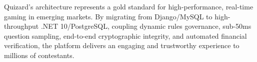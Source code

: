 \documentclass[11pt,a4paper,oneside]{report}
\begin{document}
\begin{tcolorbox}[summarybox, title={Final Architecture Conclusion}]
Quizard's architecture represents a gold standard for high-performance, real-time gaming in emerging markets. By migrating from Django/MySQL to high-throughput .NET 10/PostgreSQL, coupling dynamic rules governance, sub-50ms question sampling, end-to-end cryptographic integrity, and automated financial verification, the platform delivers an engaging and trustworthy experience to millions of contestants.
\end{tcolorbox}
\end{document}
